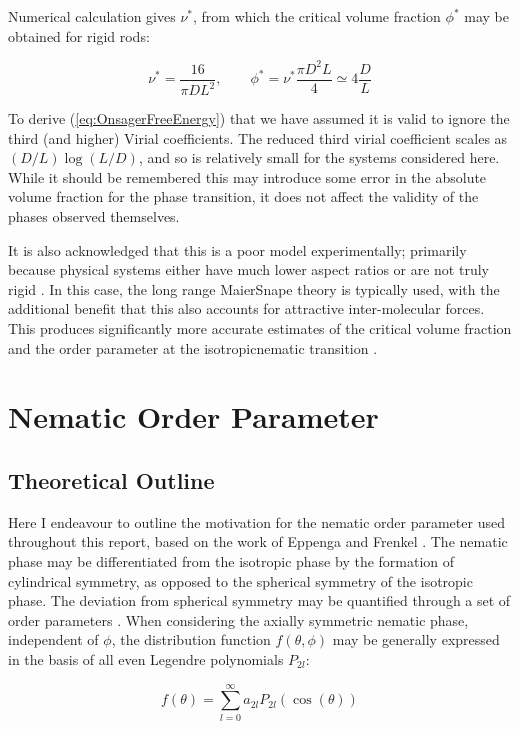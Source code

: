 \documentclass[11pt, a4paper]{article} %
\begin{document}
\begin{appendices}
Numerical calculation gives $\nu^{*}$, from which the critical volume fraction $\phi^{*}$ may be obtained for rigid rods:

\begin{equation}
\nu^{*} = \frac{16}{\pi D L^{2}}, \qquad \phi^{*} = \nu^{*} \frac{\pi D^{2} L}{4} \simeq 4 \frac{D}{L}
\end{equation}


To derive (\ref{eq:OnsagerFreeEnergy}) that we have assumed it is valid to ignore the third (and higher) Virial coefficients. The reduced third virial coefficient scales as $(D/L)\log(L/D)$, and so is relatively small for the systems considered here. While it should be remembered this may introduce some error in the absolute volume fraction for the phase transition, it does not affect the validity of the phases observed themselves.

It is also acknowledged that this is a poor model experimentally; primarily because physical systems either have much lower aspect ratios or are not truly rigid \cite{Odijk1985}. In this case, the long range Maier\textendash Snape theory \cite{Maier1959} is typically used, with the additional benefit that this also accounts for attractive inter-molecular forces. This produces significantly more accurate estimates of the critical volume fraction and the order parameter at the isotropic\textendash nematic transition \cite{Zannoni1979b}.

\section{Nematic Order Parameter} 
\subsection{Theoretical Outline}\label{sec:OrderParamTheory}
Here I endeavour to outline the motivation for the nematic order parameter used throughout this report, based on the work of Eppenga and Frenkel \cite{Eppenga1984, Frenkel1982}. The nematic phase may be differentiated from the isotropic phase by the formation of cylindrical symmetry, as opposed to the spherical symmetry of the isotropic phase. The deviation from spherical symmetry may be quantified through a set of order parameters \cite{Zannoni1979}. When considering the axially symmetric nematic phase, independent of $\phi$, the distribution function $f(\theta, \phi)$ may be generally expressed in the basis of all even Legendre polynomials $P_{2l}$:

\begin{equation}
f(\theta) = \sum_{l=0}^{\infty} a_{2l} P_{2l}(\cos(\theta))
\end{equation}


\end{appendices}
\end{document}

